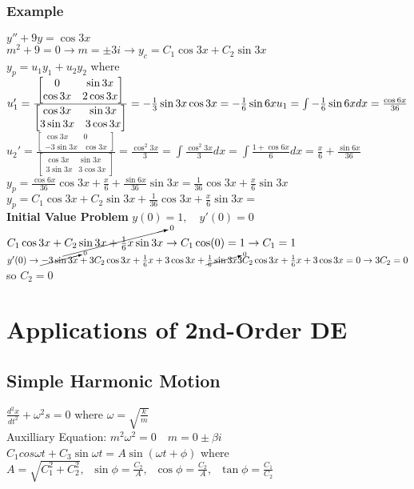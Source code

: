\documentclass{article}
\begin{document}
\subsubsection{Example}$y''+9y=\cos 3x$
\\[0.1in]$m^2+9=0 \rightarrow m=\pm 3i \rightarrow y_c=C_1 \cos 3x + C_2 \sin 3x $
\\[0.1in]$y_p=u_1y_1+u_2y_2$ where $u_1'=\frac{\begin{bmatrix}0&\sin 3x\\\cos 3x&2\cos 3x\end{bmatrix}}{\begin{bmatrix}\cos 3x&\sin 3x\\3\sin 3x & 3\cos 3x \end{bmatrix}}= -\frac{1}{3}\sin 3x \cos 3x = -\frac{1}{6}\sin 6x\\
u_1=\int -\frac{1}{6}\sin 6x dx = \frac{\cos 6x}{36}$\\
$u_2'=\frac{\begin{bmatrix}\cos 3x & 0 \\ -3\sin 3x & \cos 3x\end{bmatrix}}{\begin{bmatrix}\cos 3x&\sin 3x\\3\sin 3x & 3\cos 3x \end{bmatrix}} = \frac{\cos^2 3x}{3}=\int \frac{\cos^2 3x}{3} dx=\int \frac{1+ \cos 6x}{6} dx = \frac{x}{6}+\frac{\sin 6x}{36}$
\\$y_p=\frac{\cos 6x }{36}\cos 3x + \frac{x}{6}+\frac{\sin 6x}{36}\sin 3x = \frac{1}{36}\cos 3x + \frac{x}{6}\sin 3x$
\\$y_p=C_1 \cos 3x + C_2 \sin 3x+\frac{1}{36}\cos 3x + \frac{x}{6}\sin 3x =$ \\
\textbf{Initial Value Problem} $y(0)=1,\quad y'(0)=0$
\\$C_1\cos 3x + \cancelto{0}{C_2 \sin 3x + \frac{1}{6}x \sin 3x} \rightarrow C_1 \cos(0)=1 \rightarrow C_1=1$
\\$y'(0) \rightarrow \cancelto{0}{-3\sin 3x} +3C_2\cos 3x+\frac{1}{6}x+3\cos 3x + \cancelto{0}{\frac{1}{6}\sin 3x}\\
3C_2\cos 3x+\frac{1}{6}x+3\cos 3x=0 \rightarrow 3C_2=0$ so $C_2=0$
\\
\pagebreak
\section{Applications of 2nd-Order DE}
\subsection{Simple Harmonic Motion}
$\frac{d^2x}{dt^2}+\omega ^2s=0$ where $\omega = \sqrt{\frac{k}{m}}$
\\Auxilliary Equation: $m^2\omega ^2=0 \quad m=0\pm\beta i$
\\$C_1cos \omega t + C_3 \sin \omega t = A\sin (\omega t + \phi)$ where $A=\sqrt{C_1^2+C_2^2},\;\; \sin\phi=\frac{C_2}{A},\;\; \cos\phi=\frac{C_2}{A},\;\;\tan\phi=\frac{C_1}{C_2}$
\end{document}
